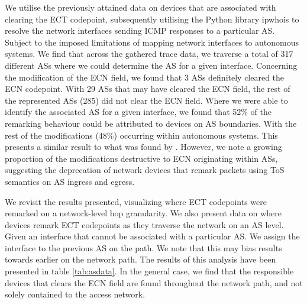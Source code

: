 \documentclass{l4proj}
\begin{document}
We utilise the previously attained data on devices that are associated with clearing the ECT codepoint, subsequently utilising the Python library ipwhois to resolve the network interfaces sending ICMP responses to a particular AS. Subject to the imposed limitations of mapping network interfaces to autonomous systems\cite{mapping_accuracy}. We find that across the gathered trace data, we traverse a total of 317 different ASs where we could determine the AS for a given interface. Concerning the modification of the ECN field, we found that 3 ASs definitely cleared the ECN codepoint. With 29 ASs that may have cleared the ECN field, the rest of the represented ASs (285) did not clear the ECN field. Where we were able to identify the associated AS for a given interface, we found that 52\% of the remarking behaviour could be attributed to devices on AS boundaries. With the rest of the modifications (48\%) occurring within autonomous systems. This presents a similar result to what was found by \cite{mcquistin_is_2015}. However, we note a growing proportion of the modifications destructive to ECN originating within ASs, suggesting the deprecation of network devices that remark packets using ToS semantics on AS ingress and egress.

We revisit the results presented, visualizing where ECT codepoints were remarked on a network-level hop granularity. We also present data on where devices remark ECT codepoints as they traverse the network on an AS level. Given an interface that cannot be associated with a particular AS. We assign the interface to the previous AS on the path. We note that this may bias results towards earlier on the network path. The results of this analysis have been presented in table \ref{tab:asdata}. In the general case, we find that the responsible devices that clears the ECN field are found throughout the network path, and not solely contained to the access network.
\end{document}
